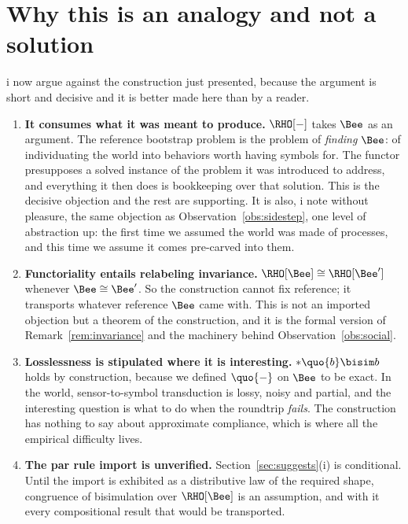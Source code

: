 \section{Why this is an analogy and not a solution}
\label{sec:notasolution}

i now argue against the construction just presented, because the
argument is short and decisive and it is better made here than by a
reader.

\begin{enumerate}[label=\textbf{(\alph*)},leftmargin=2.4em]

\item \textbf{It consumes what it was meant to produce.}
$\RHO[-]$ takes $\Bee$ as an argument.
The reference bootstrap problem is the problem of \emph{finding}
$\Bee$: of individuating the world into behaviors worth having
symbols for.
The functor presupposes a solved instance of the problem it was
introduced to address, and everything it then does is bookkeeping
over that solution.
This is the decisive objection and the rest are supporting.
It is also, i note without pleasure, the same objection as
Observation~\ref{obs:sidestep}, one level of abstraction up: the
first time we assumed the world was made of processes, and this
time we assume it comes pre-carved into them.

\item \textbf{Functoriality entails relabeling invariance.}
$\RHO[\Bee] \cong \RHO[\Bee']$ whenever $\Bee \cong \Bee'$.
So the construction cannot fix reference; it transports whatever
reference $\Bee$ came with.
This is not an imported objection but a theorem of the
construction, and it is the formal version of
Remark~\ref{rem:invariance} and the machinery behind
Observation~\ref{obs:social}.

\item \textbf{Losslessness is stipulated where it is interesting.}
$*\quo{b} \bisim b$ holds by construction, because we defined
$\quo{-}$ on $\Bee$ to be exact.
In the world, sensor-to-symbol transduction is lossy, noisy and
partial, and the interesting question is what to do when the
roundtrip \emph{fails}.
The construction has nothing to say about approximate compliance,
which is where all the empirical difficulty lives.

\item \textbf{The par rule import is unverified.}
Section~\ref{sec:suggests}(i) is conditional.
Until the import is exhibited as a distributive law of the required
shape, congruence of bisimulation over $\RHO[\Bee]$ is an
assumption, and with it every compositional result that would be
transported.


\end{enumerate}
